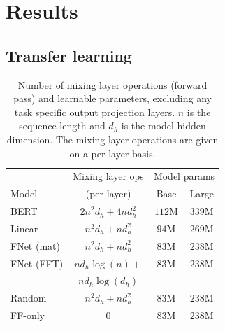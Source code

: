 \section{Results}
\label{sec:results}


\subsection{Transfer learning}
\label{subsec:transfer_learning}

\begin{table}
    \caption{Number of mixing layer operations (forward pass) and learnable parameters, excluding any task specific output projection layers. $n$ is the sequence length and $d_{h}$ is the model hidden dimension. The mixing layer operations are given on a per layer basis.}
    \label{tab:model_params}
    \centering
    \setlength{\tabcolsep}{3pt}
    \begin{tabular}{l | c | c  c}
        \hline
         & Mixing layer ops & \multicolumn{2}{c}{Model params} \\ 
         Model & (per layer) & Base & Large \\  \hline \hline
         BERT & $2 n^2 d_{h} + 4 n d_{h}^2$ & $112$M & $339$M \\
         Linear & $n^2 d_{h} + n d_{h}^2$ & $94$M & $269$M \\
         FNet (mat) & $n^2 d_{h} + n d_{h}^2$ & $83$M & $238$M \\
         FNet (FFT) & $n d_{h} \log(n) +$ & $83$M & $238$M \\
         & $n d_{h}\log(d_{h})$ & \\
         Random & $n^2 d_{h} + nd_{h}^2$ & $83$M & $238$M \\
         FF-only & $0$ & $83$M & $238$M \\ \hline
    \end{tabular} 
\end{table}

